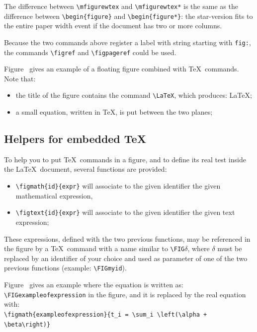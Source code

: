\documentclass[book,taskpackage,specpackage,codepackage]{upmethodology-document}
\begin{document}
The difference between \texttt{{\textbackslash}mfigurewtex} and \texttt{{\textbackslash}mfigurewtex*} is the same as the difference between \texttt{{\textbackslash}begin\{figure\}} and \texttt{{\textbackslash}begin\{figure*\}}: the star-version fits to the entire paper width event if the document has two or more columns.

Because the two commands above register a label with string starting with \texttt{fig:}, the commands \texttt{{\textbackslash}figref} and \texttt{{\textbackslash}figpageref} could be used.


Figure~ gives an example of a floating figure combined with \TeX\ commands. Note that:
\begin{itemize}
\item the title of the figure contains the command \texttt{{\textbackslash}LaTeX}, which produces: \LaTeX;
\item a small equation, written in \TeX, is put between the two planes;
\end{itemize}

\subsection{Helpers for embedded \TeX}

To help you to put \TeX\ commands in a figure, and to define its real test inside the \LaTeX\ document, several functions are provided:
\begin{itemize}
\item \texttt{{\textbackslash}figmath\{id\}\{expr\}} will associate to the given identifier the given mathematical expression,
\item \texttt{{\textbackslash}figtext\{id\}\{expr\}} will associate to the given identifier the given text expression;
\end{itemize}

These expressions, defined with the two previous functions, may be referenced in the figure by a \TeX\ command with a name similar to \texttt{{\textbackslash}FIG$\delta$}, where $\delta$ must be replaced by an identifier of your choice and used as parameter of one of the two previous functions (example: \texttt{{\textbackslash}FIGmyid}).

Figure~ gives an example where the equation is written as: \texttt{{\textbackslash}FIGexampleofexpression} in the figure, and it is replaced by the real equation with: \\
\texttt{{\textbackslash}figmath\{exampleofexpression\}\{t\_i = {\textbackslash}sum\_i {\textbackslash}left({\textbackslash}alpha + {\textbackslash}beta{\textbackslash}right)\}}
\end{document}
